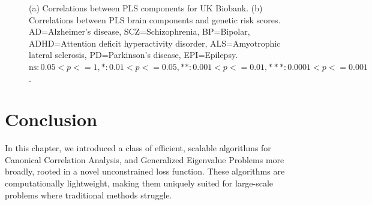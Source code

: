 \begin{figure}
\begin{subfigure}[b]{0.72\textwidth}
        \caption{}
        \label{fig:genetic_risk}
    \end{subfigure}
    \caption{(a) Correlations between PLS components for UK Biobank. (b) Correlations between PLS brain components and genetic risk scores. AD=Alzheimer's disease, SCZ=Schizophrenia, BP=Bipolar, ADHD=Attention deficit hyperactivity disorder, ALS=Amyotrophic lateral sclerosis, PD=Parkinson's disease, EPI=Epilepsy. $\text{ns}: 0.05< p <= 1, \ast: 0.01< p <=0.05, \ast\ast: 0.001< p <= 0.01, \ast\ast\ast: 0.0001< p <= 0.001$.}
\end{figure}

\section{Conclusion}

In this chapter, we introduced a class of efficient, scalable algorithms for Canonical Correlation Analysis, and Generalized Eigenvalue Problems more broadly, rooted in a novel unconstrained loss function.
These algorithms are computationally lightweight, making them uniquely suited for large-scale problems where traditional methods struggle.